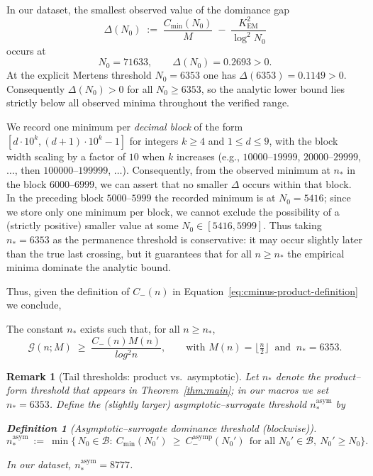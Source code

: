 \documentclass[11pt]{article}
\makeatletter
\theoremstyle{inline}
\newtheorem*{remark}{Remark}
\theoremstyle{break}
\renewenvironment{proof}[1][\proofname]{%
  \par\pushQED{\qed}%
  \normalfont \topsep6\p@\@plus6\p@\relax
  \trivlist
  \item[\hskip\labelsep
        \itshape
    #1\@addpunct{.}]\mbox{}\\  %
}{%
  \popQED\endtrivlist\@endpefalse
}
\theoremstyle{break}
\theoremstyle{break}
\theoremstyle{break}
\theoremstyle{break}
\theoremstyle{break}
\theoremstyle{break}
\newtheorem{definition}{Definition}
\theoremstyle{inline}
\newcommand{\xPreMertens}{5416} %
\newcommand{\xMertens}{6353} %
\newcommand{\xNasymStar}{8777}  %
\newcommand{\xNzeroStat}{71633} %
\newcommand{\xEtaStat}{0.2693} %
\newcommand{\xDeltaMertens}{0.1149}  %
\newcommand{\Cmeas}{C}              %
\newcommand{\CminusProduct}{C_{-}}
\newcommand{\CminusAsymp}{C_{-}^{\mathrm{asymp}}}
\newcommand{\Kem}{K_{\mathrm{EM}}}              %
\newcommand{\nprodstar}{n_{\ast}}  %
\newcommand{\nasymstar}{n_{\ast}^{\mathrm{asym}}}  %
\makeatother
\begin{document}
\begin{proof}
In our dataset, the smallest observed value of the dominance gap
\begin{equation}
\Delta(N_0)\;:=\;\frac{\Cmeas_{\min}(N_0)}{M}\;-\;\frac{\Kem^2}{\log^2 N_0}
\end{equation}
occurs at
\begin{equation}
N_0=\xNzeroStat,\qquad \Delta(N_0)=\xEtaStat>0.
\end{equation}
At the explicit Mertens threshold \(N_0=\xMertens\) one has
\(\Delta(\xMertens)=\xDeltaMertens>0\).
Consequently \(\Delta(N_0)>0\) for all \(N_0\ge \xMertens\), so the analytic
lower bound lies strictly below all observed minima throughout the verified range.

We record one minimum per \emph{decimal block} of the form
\([d\cdot 10^{k},(d+1)\cdot 10^{k}-1]\) for integers \(k\ge 4\) and \(1\le d\le 9\),
with the block width scaling by a factor of \(10\) when \(k\) increases (e.g.,
\(10000\text{–}19999\), \(20000\text{–}29999\), \(\dots\), then \(100000\text{–}199999\), \(\dots\)).
Consequently, from the observed minimum at \(\nprodstar\) in the block
\(6000\text{–}6999\), we can assert that no smaller \( \Delta \) occurs within that block.
In the preceding block \(5000\text{–}5999\) the recorded minimum is at \(N_0=\xPreMertens\);
since we store only one minimum per block, we cannot exclude the possibility of a
(strictly positive) smaller value at some \(N_0\in[\xPreMertens,5999]\). Thus taking
\(\nprodstar=\xMertens\) as the permanence threshold is conservative: it may occur
slightly later than the true last crossing, but it guarantees that for all
\(n\ge \nprodstar\) the empirical minima dominate the analytic bound.

\bigskip
\noindent
Thus, given the definition of \( \CminusProduct(n) \) in Equation~\ref{eq:cminus-product-definition} we conclude,

The constant \( \nprodstar \) exists such that, for all \(n \ge \nprodstar\),
  \begin{equation}
    \mathcal{G}(n;M)\;\ge\;\frac{\CminusProduct(n)M(n)}{log^2 n},
    \qquad
    \text{with } M(n)=\bigl\lfloor \tfrac{n}{2} \bigr\rfloor
    \ \text{ and }\
    \nprodstar=\xMertens .
    \label{eq:analytic-lower-bound-global}
  \end{equation}
\end{proof}

\begin{remark}[Tail thresholds: product vs.\ asymptotic]
\label{rem:tail-thresholds}
Let \(\nprodstar\) denote the product–form threshold that appears in Theorem~\ref{thm:main};
in our macros we set \(\nprodstar=\xMertens\).
Define the (slightly larger) asymptotic–surrogate threshold \(\nasymstar\) by
\begin{definition}[Asymptotic–surrogate dominance threshold (blockwise)]\label{def:nasym-block}
\begin{equation}
\nasymstar \ :=\ \min\Big\{\,N_0\in\mathcal B:\ 
\Cmeas_{\min}(N_0')\ \ge\ \CminusAsymp(N_0')\ \ \text{for all } N_0'\in\mathcal B,\ N_0'\ge N_0\Big\}.
\end{equation}
\end{definition}
In our dataset, \(\nasymstar=\xNasymStar\).
\end{remark}
\end{document}

